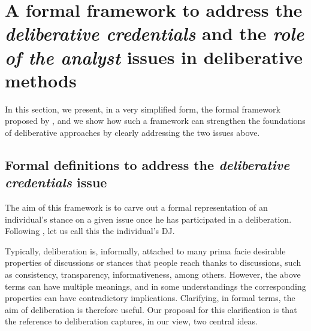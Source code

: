 \documentclass[version=3.21, pagesize, twoside=off, bibliography=totoc, DIV=calc, fontsize=12pt, a4paper, french, english]{scrartcl}
\begin{document}
\section{A formal framework to address the \emph{deliberative credentials} and the \emph{role of the analyst} issues in deliberative methods}
In this section, we present, in a very simplified form, the formal framework proposed by \citet{cailloux_formal_2019}, and we show how such a framework can strengthen the foundations of deliberative approaches by clearly addressing the two issues above.

\subsection{Formal definitions to address the \emph{deliberative credentials} issue}
The aim of this framework is to carve out a formal representation of an individual’s stance on a given issue once he has participated in a deliberation. 
Following \citet{cailloux_formal_2019}, let us call this the individual’s \ac{DJ}. 

Typically, deliberation is, informally, attached to many prima facie desirable properties of discussions or stances that people reach thanks to discussions, such as consistency, transparency, informativeness, among others. However, the above terms can have multiple meanings, and in some understandings the corresponding properties can have contradictory implications. Clarifying, in formal terms, the aim of deliberation is therefore useful. Our proposal for this clarification is that the reference to deliberation captures, in our view, two central ideas.
\end{document}
